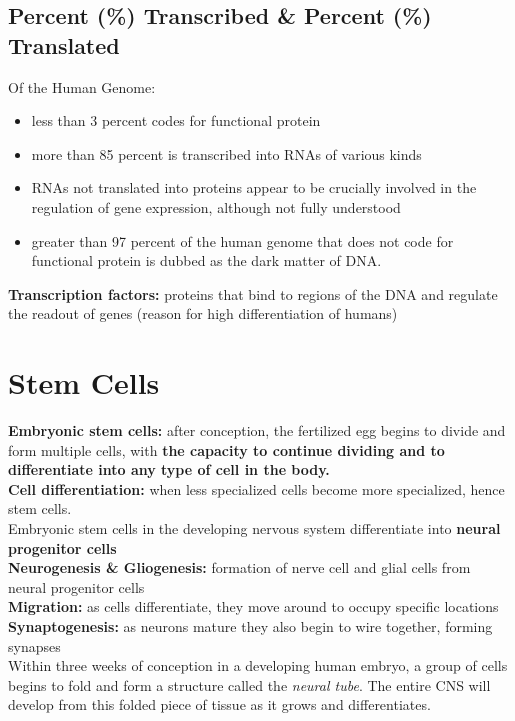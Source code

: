 \documentclass{article}
\begin{document}
\subsection{Percent (\%) Transcribed \& Percent (\%) Translated}
Of the Human Genome: 
\begin{itemize}
    \item less than 3 percent codes for functional protein
    \item more than 85 percent is transcribed into RNAs of various kinds
    \item RNAs not translated into proteins appear to be crucially involved in the regulation of gene expression, although not fully understood
    \item greater than 97 percent of the human genome that does not code for functional protein is dubbed as the dark matter of DNA. 
\end{itemize}
\textbf{Transcription factors:} proteins that bind to regions of the DNA and regulate the readout of genes (reason for high differentiation of humans)

\section{Stem Cells}
\textbf{Embryonic stem cells:} after conception, the fertilized egg begins to divide and form multiple cells, with \textbf{the capacity to continue dividing and to differentiate into any type of cell in the body.} \\ 

\noindent \textbf{Cell differentiation:} when less specialized cells become more specialized, hence stem cells. \\

\noindent Embryonic stem cells in the developing nervous system differentiate into \textbf{neural progenitor cells} \\

\noindent \textbf{Neurogenesis \& Gliogenesis:} formation of nerve cell and glial cells from neural progenitor cells \\

\noindent \textbf{Migration:} as cells differentiate, they move around to occupy specific locations \\

\noindent \textbf{Synaptogenesis:} as neurons mature they also begin to wire together, forming synapses \\
Within three weeks of conception in a developing human embryo, a group of cells begins to fold and form a structure called the \textit{neural tube}. The entire CNS will develop from this folded piece of tissue as it grows and differentiates. \\
\end{document}
